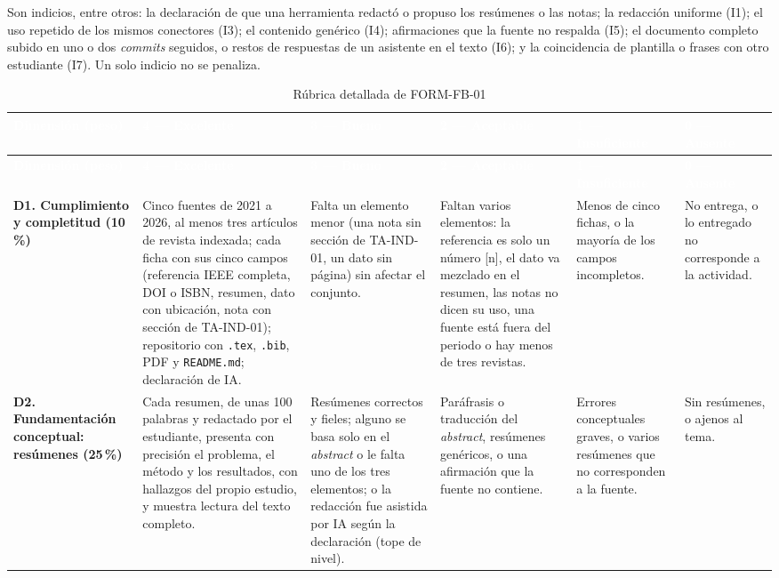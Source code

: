 \documentclass[11pt,a4paper]{article}
\renewcommand{\arraystretch}{1.25}
\newcommand{\hdr}[1]{\textcolor{white}{\textbf{#1}}}
\begin{document}
Son indicios, entre otros: la declaración de que una herramienta redactó o propuso los resúmenes o las notas; la redacción uniforme (I1); el uso repetido de los mismos conectores (I3); el contenido genérico (I4); afirmaciones que la fuente no respalda (I5); el documento completo subido en uno o dos \emph{commits} seguidos, o restos de respuestas de un asistente en el texto (I6); y la coincidencia de plantilla o frases con otro estudiante (I7). Un solo indicio no se penaliza.

\begin{landscape}
\setlength{\LTpre}{2pt}
\renewcommand{\arraystretch}{1.08}
\scriptsize
\begin{xltabular}{\linewidth}{@{}L{3.2cm}YYYYL{2.7cm}@{}}
	\caption{Rúbrica detallada de FORM-FB-01}\label{tab:rubrica}\\
	\toprule
	\hdr{Dimensión (peso)} & \hdr{4 --- Excelente} & \hdr{3 --- Bueno} & \hdr{2 --- Aceptable} & \hdr{1 --- Insuficiente} & \hdr{0 --- Ausente} \\
	\midrule
	\endfirsthead
	\toprule
	\hdr{Dimensión (peso)} & \hdr{4 --- Excelente} & \hdr{3 --- Bueno} & \hdr{2 --- Aceptable} & \hdr{1 --- Insuficiente} & \hdr{0 --- Ausente} \\
	\midrule
	\endhead
	\textbf{D1. Cumplimiento y completitud (10\,\%)} & Cinco fuentes de 2021 a 2026, al menos tres artículos de revista indexada; cada ficha con sus cinco campos (referencia IEEE completa, DOI o ISBN, resumen, dato con ubicación, nota con sección de TA-IND-01); repositorio con \texttt{.tex}, \texttt{.bib}, PDF y \texttt{README.md}; declaración de IA. & Falta un elemento menor (una nota sin sección de TA-IND-01, un dato sin página) sin afectar el conjunto. & Faltan varios elementos: la referencia es solo un número [n], el dato va mezclado en el resumen, las notas no dicen su uso, una fuente está fuera del periodo o hay menos de tres revistas. & Menos de cinco fichas, o la mayoría de los campos incompletos. & No entrega, o lo entregado no corresponde a la actividad. \\
	\addlinespace
	\textbf{D2. Fundamentación conceptual: resúmenes (25\,\%)} & Cada resumen, de unas 100 palabras y redactado por el estudiante, presenta con precisión el problema, el método y los resultados, con hallazgos del propio estudio, y muestra lectura del texto completo. & Resúmenes correctos y fieles; alguno se basa solo en el \emph{abstract} o le falta uno de los tres elementos; o la redacción fue asistida por IA según la declaración (tope de nivel). & Paráfrasis o traducción del \emph{abstract}, resúmenes genéricos, o una afirmación que la fuente no contiene. & Errores conceptuales graves, o varios resúmenes que no corresponden a la fuente. & Sin resúmenes, o ajenos al tema. \\

\end{xltabular}
\end{landscape}
\end{document}
